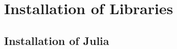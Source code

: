 \chapter{Installation of Libraries}
\label{appendix:installation_libraries}
\section{Installation of Julia}
